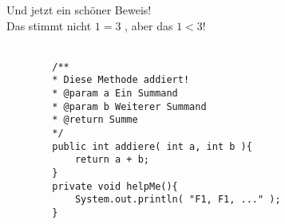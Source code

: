 \documentclass{kimbblaetter}
\begin{document}
	\showinfo

	
	
	Und jetzt ein schöner Beweis!
	\beweisbox
	\\
	Das stimmt nicht $ 1 = 3 $ \kreuzf, aber das $ 1 < 3 $\hakenw!
	\\
	\\
	
	\begin{lstlisting}
		/**
		* Diese Methode addiert!
		* @param a Ein Summand
		* @param b Weiterer Summand
		* @return Summe
		*/
		public int addiere( int a, int b ){
			return a + b;
		}
		private void helpMe(){
			System.out.println( "F1, F1, ..." );
		}
	\end{lstlisting}
	
\end{document}
